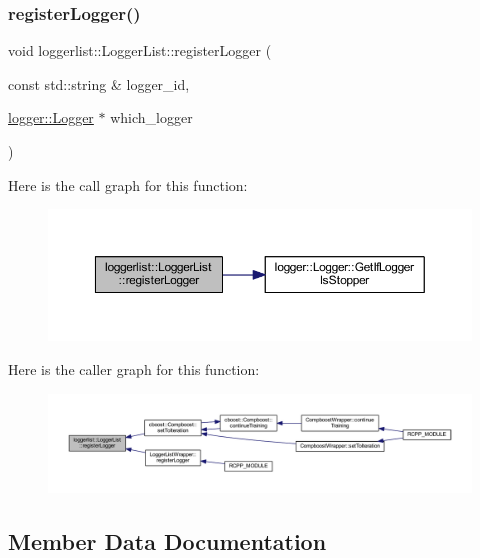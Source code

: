 \subsubsection{\texorpdfstring{register\+Logger()}{registerLogger()}}
{\footnotesize\ttfamily void loggerlist\+::\+Logger\+List\+::register\+Logger (\begin{DoxyParamCaption}\item[{const std\+::string \&}]{logger\+\_\+id,  }\item[{\mbox{\hyperlink{classlogger_1_1_logger}{logger\+::\+Logger}} $\ast$}]{which\+\_\+logger }\end{DoxyParamCaption})}

Here is the call graph for this function\+:\nopagebreak
\begin{figure}[H]
\begin{center}
\leavevmode
\includegraphics[width=350pt]{classloggerlist_1_1_logger_list_a883c2526c3e56e572df670f64b966d41_cgraph}
\end{center}
\end{figure}
Here is the caller graph for this function\+:\nopagebreak
\begin{figure}[H]
\begin{center}
\leavevmode
\includegraphics[width=350pt]{classloggerlist_1_1_logger_list_a883c2526c3e56e572df670f64b966d41_icgraph}
\end{center}
\end{figure}


\subsection{Member Data Documentation}
\mbox{\label{classloggerlist_1_1_logger_list_a56997d07c587921a70b0b2c6538ce1f0}} 
